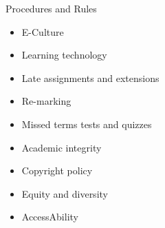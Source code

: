 \documentclass{beamer}
\begin{document}
\begin{frame}{Procedures and Rules}
    \begin{itemize}[<+->]
        \item E-Culture 
        \item Learning technology
        \item Late assignments and extensions
        \item Re-marking
        \item Missed terms tests and quizzes
        \item Academic integrity
        \item Copyright policy
        \item Equity and diversity
        \item AccessAbility
    \end{itemize}
\end{frame}
\end{document}
